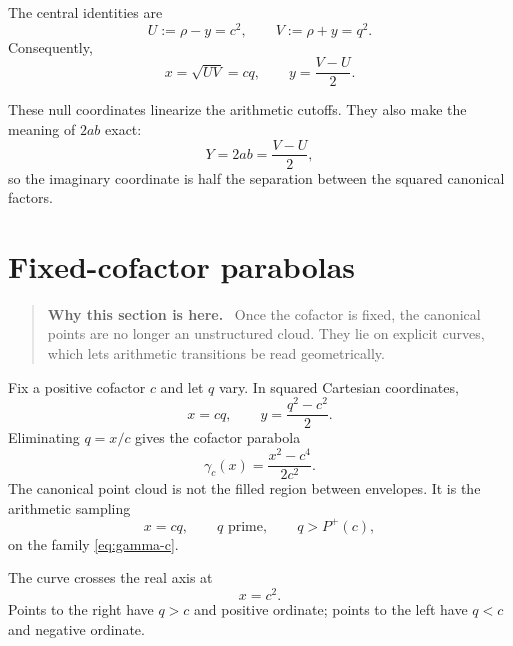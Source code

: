 \documentclass[11pt]{article}
\theoremstyle{definition}
\theoremstyle{remark}
\newcommand{\Pplus}{P^{+}}
\newcommand{\1}{\mathbf{1}}
\newenvironment{motivation}
  {\begin{quote}\small\color{ovvogray}\textbf{Why this section is here.}\ }
  {\end{quote}}
\begin{document}
The central identities are
\begin{equation}
 \boxed{
 U:=\rho-y=c^2,
 \qquad
 V:=\rho+y=q^2.
 }
 \label{eq:UV}
\end{equation}
Consequently,
\begin{equation}
 x=\sqrt{UV}=cq,
 \qquad
 y=\frac{V-U}{2}.
 \label{eq:xy-UV}
\end{equation}

These null coordinates linearize the arithmetic cutoffs.  They also make the meaning of $2ab$ exact:
\begin{equation}
 \boxed{Y=2ab=\frac{V-U}{2},}
 \label{eq:Y-null}
\end{equation}
so the imaginary coordinate is half the separation between the squared canonical factors.

\section{Fixed-cofactor parabolas}
\label{sec:cofactor-curves}

\begin{motivation}
Once the cofactor is fixed, the canonical points are no longer an unstructured cloud.  They lie on explicit curves, which lets arithmetic transitions be read geometrically.
\end{motivation}

Fix a positive cofactor $c$ and let $q$ vary.  In squared Cartesian coordinates,
\begin{equation}
 x=cq,
 \qquad
 y=\frac{q^2-c^2}{2}.
 \label{eq:curve-param}
\end{equation}
Eliminating $q=x/c$ gives the cofactor parabola
\begin{equation}
 \boxed{
 \gamma_c(x)
 =\frac{x^2-c^4}{2c^2}.
 }
 \label{eq:gamma-c}
\end{equation}
The canonical point cloud is not the filled region between envelopes.  It is the arithmetic sampling
\begin{equation}
 x=cq,
 \qquad
 q\text{ prime},
 \qquad
 q>\Pplus(c),
 \label{eq:curve-sampling}
\end{equation}
on the family \cref{eq:gamma-c}.

The curve crosses the real axis at
\begin{equation}
 x=c^2.
 \label{eq:curve-axis-cross}
\end{equation}
Points to the right have $q>c$ and positive ordinate; points to the left have $q<c$ and negative ordinate.
\end{document}
